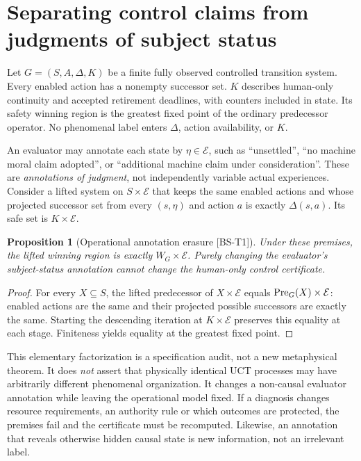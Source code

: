 \documentclass[11pt,a4paper]{article}
\newtheorem{proposition}[theorem]{Proposition}
\theoremstyle{definition}\newtheorem{definition}{Definition}
\newcommand{\idtag}[1]{\textnormal{\textsf{[#1]}}}
\begin{document}
\section{Separating control claims from judgments of subject status}
\label{sec:status}
Let $G=(S,A,\Delta,K)$ be a finite fully observed controlled transition system. Every enabled action has a nonempty successor set. $K$ describes human-only continuity and accepted retirement deadlines, with counters included in state. Its safety winning region is the greatest fixed point of the ordinary predecessor operator. No phenomenal label enters $\Delta$, action availability, or $K$.

An evaluator may annotate each state by $\eta\in\mathcal E$, such as ``unsettled'', ``no machine moral claim adopted'', or ``additional machine claim under consideration''. These are \emph{annotations of judgment}, not independently variable actual experiences. Consider a lifted system on $S\times\mathcal E$ that keeps the same enabled actions and whose projected successor set from every $(s,\eta)$ and action $a$ is exactly $\Delta(s,a)$. Its safe set is $K\times\mathcal E$.

\begin{proposition}[Operational annotation erasure \idtag{BS-T1}]
\label{prop:erasure}
Under these premises, the lifted winning region is exactly $W_G\times\mathcal E$. Purely changing the evaluator's subject-status annotation cannot change the human-only control certificate.
\end{proposition}
\begin{proof}
For every $X\subseteq S$, the lifted predecessor of $X\times\mathcal E$ equals $\operatorname{Pre}_G(X)\times\mathcal E$: enabled actions are the same and their projected possible successors are exactly the same. Starting the descending iteration at $K\times\mathcal E$ preserves this equality at each stage. Finiteness yields equality at the greatest fixed point.
\end{proof}
This elementary factorization is a specification audit, not a new metaphysical theorem. It does \emph{not} assert that physically identical UCT processes may have arbitrarily different phenomenal organization. It changes a non-causal evaluator annotation while leaving the operational model fixed. If a diagnosis changes resource requirements, an authority rule or which outcomes are protected, the premises fail and the certificate must be recomputed. Likewise, an annotation that reveals otherwise hidden causal state is new information, not an irrelevant label.
\end{document}
